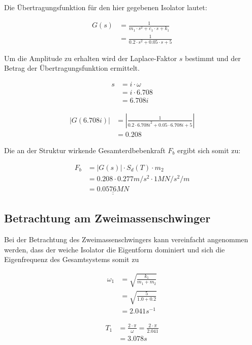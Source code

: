 Die Übertragungsfunktion für den hier gegebenen Isolator lautet:

\begin{align*}
G(s) &= \frac{1}{m_1 \cdot s^2 + c_1 \cdot s + k_1}\\
     &= \frac{1}{0.2 \cdot s^2 + 0.05 \cdot s + 5}
\end{align*}

Um die Amplitude zu erhalten wird der Laplace-Faktor $s$ bestimmt und der Betrag der Übertragungsfunktion ermittelt.

\begin{align*}
s &= i \cdot \omega\\
  &= i \cdot 6.708\\
  &= 6.708i
\end{align*}

\begin{align*}
|G(6.708i)| &= |\frac{1}{0.2 \cdot 6.708i^2 + 0.05 \cdot 6.708i + 5}|\\
            &= 0.208
\end{align*}

Die an der Struktur wirkende Gesamterdbebenkraft $F_b$ ergibt sich somit zu:

\begin{align*}
F_b &= |G(s)| \cdot S_d(T) \cdot m_2\\
    &= 0.208 \cdot 0.277 m/s^2 \cdot 1 MN/s^2/m\\
    &= \underline{\underline{0.0576 MN}}
\end{align*}

\subsection{Betrachtung am Zweimassenschwinger}

Bei der Betrachtung des Zweimassenschwingers kann vereinfacht angenommen werden, dass der weiche Isolator die Eigentform dominiert \cite{AKK} und sich die Eigenfrequenz des Gesamtsystems somit zu

\begin{align*}
\omega_1 &= \sqrt{\frac{k_1}{m_1 + m_2}}\\
         &= \sqrt{\frac{5}{1.0 + 0.2}}\\
         &= 2.041 s^{-1}
\end{align*}

\begin{align*}
T_1 &= \frac{2 \cdot \pi}{\omega} = \frac{2 \cdot \pi}{2.041}\\
    &= 3.078 s
\end{align*}

